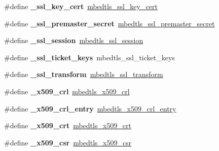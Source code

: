 \begin{DoxyCompactItemize}
\#define {\bfseries \+\_\+ssl\+\_\+key\+\_\+cert}~\mbox{\hyperlink{structmbedtls__ssl__key__cert}{mbedtls\+\_\+ssl\+\_\+key\+\_\+cert}}
\item 
\mbox{\label{compat-1_83_8h_ac7cb71d1133a8c69f8e5da331e5f9656}} 
\#define {\bfseries \+\_\+ssl\+\_\+premaster\+\_\+secret}~\mbox{\hyperlink{unionmbedtls__ssl__premaster__secret}{mbedtls\+\_\+ssl\+\_\+premaster\+\_\+secret}}
\item 
\mbox{\label{compat-1_83_8h_a0926d71974f38b1de374aad845d7a465}} 
\#define {\bfseries \+\_\+ssl\+\_\+session}~\mbox{\hyperlink{structmbedtls__ssl__session}{mbedtls\+\_\+ssl\+\_\+session}}
\item 
\mbox{\label{compat-1_83_8h_acf2e93d2931534f66f9b31f0c5da8f23}} 
\#define {\bfseries \+\_\+ssl\+\_\+ticket\+\_\+keys}~mbedtls\+\_\+ssl\+\_\+ticket\+\_\+keys
\item 
\mbox{\label{compat-1_83_8h_ab25accc41b13e24df3785da821d25bf1}} 
\#define {\bfseries \+\_\+ssl\+\_\+transform}~\mbox{\hyperlink{structmbedtls__ssl__transform}{mbedtls\+\_\+ssl\+\_\+transform}}
\item 
\mbox{\label{compat-1_83_8h_a1334a6cf76c3123edfbfd1ee7a37b2ee}} 
\#define {\bfseries \+\_\+x509\+\_\+crl}~\mbox{\hyperlink{structmbedtls__x509__crl}{mbedtls\+\_\+x509\+\_\+crl}}
\item 
\mbox{\label{compat-1_83_8h_a7b3ba2f7e216aea4131a35179bf10254}} 
\#define {\bfseries \+\_\+x509\+\_\+crl\+\_\+entry}~\mbox{\hyperlink{structmbedtls__x509__crl__entry}{mbedtls\+\_\+x509\+\_\+crl\+\_\+entry}}
\item 
\mbox{\label{compat-1_83_8h_a0bfab43fdb4c0777fcbf5bae9d80b3f1}} 
\#define {\bfseries \+\_\+x509\+\_\+crt}~\mbox{\hyperlink{structmbedtls__x509__crt}{mbedtls\+\_\+x509\+\_\+crt}}
\item 
\mbox{\label{compat-1_83_8h_a488d75c86f0ed052aad6cbfebd6b2972}} 
\#define {\bfseries \+\_\+x509\+\_\+csr}~\mbox{\hyperlink{structmbedtls__x509__csr}{mbedtls\+\_\+x509\+\_\+csr}}
\item 
\mbox{\label{compat-1_83_8h_a3f9cfef42ae0c24349308f75cbecb5bc}} 

\end{DoxyCompactItemize}
